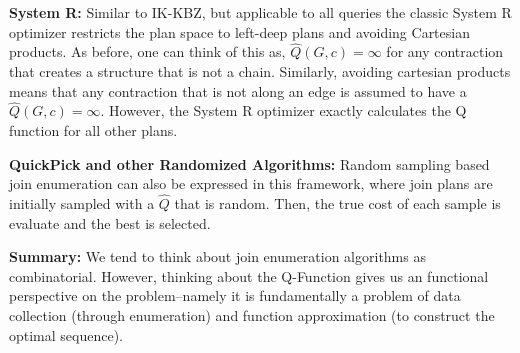 \vspace{0.25em} \noindent \textbf{System R: } Similar to IK-KBZ, but applicable to all queries the classic System R optimizer restricts the plan space to left-deep plans and avoiding Cartesian products. As before, one can think of this as, $\hat{Q}(G, c) = \infty$ for any contraction that creates a structure that is not a chain. Similarly, avoiding cartesian products means that any contraction that is not along an edge is assumed to have a $\hat{Q}(G,c) = \infty$. However, the System R optimizer exactly calculates the Q function for all other plans.

\vspace{0.25em} \noindent \textbf{QuickPick and other Randomized Algorithms: } Random sampling based join enumeration can also be expressed in this framework, where join plans are initially sampled with a $\hat{Q}$ that is random. Then, the true cost of each sample is evaluate and the best is selected. 

\vspace{0.25em} \noindent \textbf{Summary: } We tend to think about join enumeration algorithms as combinatorial. However, thinking about the Q-Function gives us an functional perspective on the problem--namely it is fundamentally a problem of data collection (through enumeration) and function approximation (to construct the optimal sequence).  



